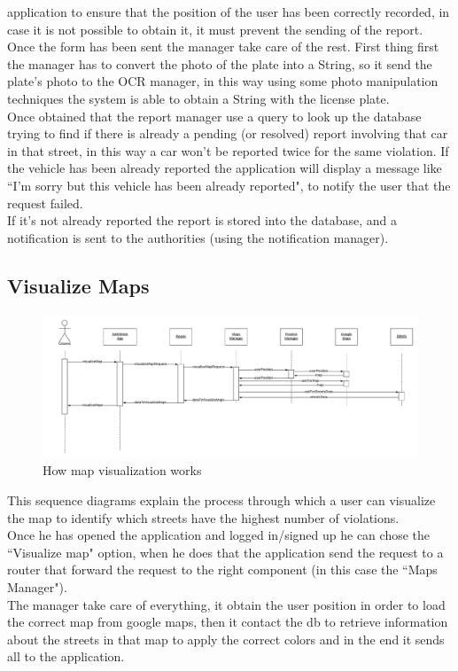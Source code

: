 \documentclass[12pt,a4paper]{report}
\begin{document}
				application to ensure that the position of the user has been correctly recorded, in case it is not possible to
				obtain it, it must prevent the sending of the report. \\
				Once the form has been sent the manager take care of the rest. First thing first the manager has to convert
				the photo of the plate into a String, so it send the plate's photo to the OCR manager, in this way using some
				photo manipulation techniques the system is able to obtain a String with the license plate.\\
				Once obtained that the report manager use a query to look up the database trying to find if there is already a
				pending (or resolved) report involving that car in that street, in this way a car won't be reported twice for the
				same
				violation. If the vehicle has been already reported the application will display a message like ``I'm sorry but
				this vehicle has been already reported", to notify the user that the request failed.\\
				If it's not already reported the report is stored into the database, and a notification is sent to the authorities
				(using the notification manager).
			\subsection{Visualize Maps}
				\begin{figure}[H]
						\includegraphics[width = \textwidth, center]{Maps}
						\caption{How map visualization works}
						\label{fig: diagrams}
				\end{figure}

				This sequence diagrams explain the process through which a user can visualize the map to identify which
				streets have the highest number of violations.\\
				Once he has opened the application and logged in/signed up he can chose the ``Visualize map" option,
				when he does that the application send the request to a router that forward the request to the right
				component (in this case the ``Maps Manager").\\
				The manager take care of everything, it obtain the user position in order to load the correct map from google
				maps, then it contact the db to retrieve information about the streets in that map to apply the correct colors
				and in the end it sends all to the application.
\end{document}
